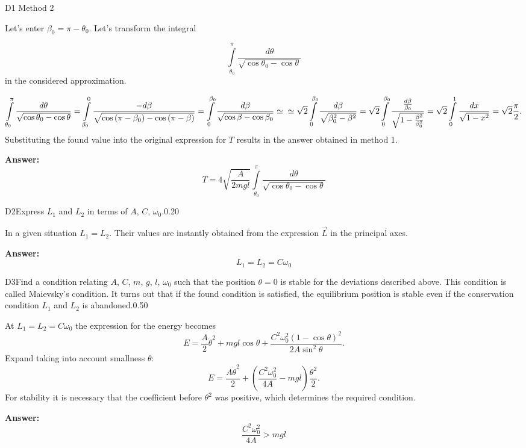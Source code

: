 \documentclass[11pt,a4paper]{article}
\begin{document}
\begin{solcard}{D1}
Method 2


Let's enter $\beta_0 = \pi - \theta_0$. Let's transform the integral


$$\int\limits_{\theta_0}^{\pi}{\frac{d\theta}{\sqrt{\cos{\theta_0} - \cos{\theta}}}}$$ in the considered approximation.


$$\int\limits_{\theta_0}^{\pi}{\frac{d\theta}{\sqrt{\cos{\theta_0} - \cos{\theta}}}} = \int\limits_{\beta_0}^{0}{\frac{-d\beta}{\sqrt{\cos{(\pi - \beta_0)} - \cos{(\pi - \beta)}}}} = \int\limits_{0}^{\beta_0}{\frac{d\beta}{\sqrt{\cos \beta - \cos \beta_0}}} \simeq \\ \simeq \sqrt{2} \int\limits_{0}^{\beta_0}{\frac{d\beta}{\sqrt{\beta_0^2 - \beta^2}}} = \sqrt{2} \int\limits_{0}^{\beta_0}{\frac{\frac{d\beta}{\beta_0}}{\sqrt{1 - \frac{\beta^2}{\beta_0^2}}}} = \sqrt{2} \int\limits_{0}^{1}{\frac{dx}{\sqrt{1 -x^2}}} = \sqrt{2} \frac{\pi}{2}.$$ Substituting the found value into the original expression for $T$ results in the answer obtained in method 1.

\par\smallskip\noindent\textbf{Answer:} $$ T = 4\sqrt{\frac{A}{2mgl}}\int\limits_{\theta_0}^{\pi}{\frac{d\theta}{\sqrt{\cos{\theta_0} - \cos{\theta}}}} $$
\end{solcard}

\begin{solcard}{D2}{Express $L_1$ and $L_2$ in terms of $A$, $C$, $\omega_0$.}{0.20}

In a given situation $L_1 = L_2$. Their values are instantly obtained from the expression $\vec{L}$ in the principal axes.

\par\smallskip\noindent\textbf{Answer:} $$ L_1 = L_2 = C \omega_0 $$
\end{solcard}

\begin{solcard}{D3}{Find a condition relating $A$, $C$, $m$, $g$, $l$, $\omega_0$ such that the position $\theta = 0$ is stable for the deviations described above. This condition is called Maievsky's condition. It turns out that if the found condition is satisfied, the equilibrium position is stable even if the conservation condition $L_1$ and $L_2$ is abandoned.}{0.50}

At $L_1 = L_2 = C\omega_0$ the expression for the energy becomes $$E = \frac{A}{2} \dot\theta^2 + mgl \cos \theta + \frac{C^2 \omega_0^2 (1-\cos \theta)^2}{2A\sin^2\theta}.$$ Expand taking into account smallness $\theta$: $$E = \frac{A\dot\theta^2}{2} + \left(\frac{C^2 \omega_0^2}{4A} - mgl \right)\frac{\theta^2}{2}.$$ For stability it is necessary that the coefficient before $\theta^2$ was positive, which determines the required condition.

\par\smallskip\noindent\textbf{Answer:} $$ \frac{C^2\omega_0^2}{4A} > mgl $$
\end{solcard}
\end{document}
